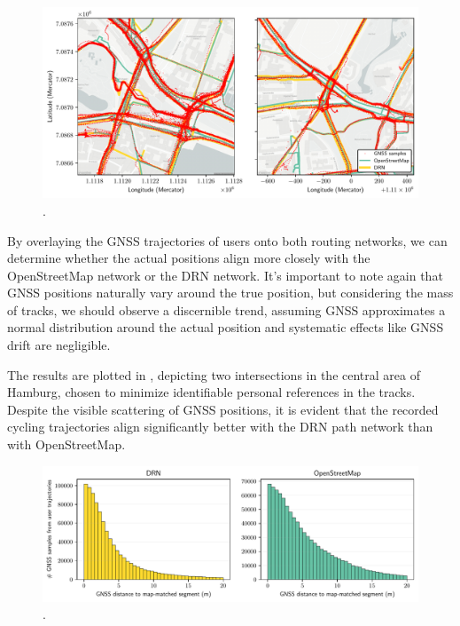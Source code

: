 \begin{figure}[t]
\centering 
\includegraphics[width=\linewidth]{images/routing-mapmatching-distance.pdf}
\caption{.}
\label{fig:routing-mapmatching-distance}
\end{figure}

By overlaying the GNSS trajectories of users onto both routing networks, we can determine whether the actual positions align more closely with the OpenStreetMap network or the DRN network. It's important to note again that GNSS positions naturally vary around the true position, but considering the mass of tracks, we should observe a discernible trend, assuming GNSS approximates a normal distribution around the actual position and systematic effects like GNSS drift are negligible.

The results are plotted in , depicting two intersections in the central area of Hamburg, chosen to minimize identifiable personal references in the tracks. Despite the visible scattering of GNSS positions, it is evident that the recorded cycling trajectories align significantly better with the DRN path network than with OpenStreetMap.

\begin{figure}[t]
\centering 
\includegraphics[width=\linewidth]{images/routing-gnss-mapmatching-distribution.pdf}
\caption{.}
\label{fig:routing-gnss-mapmatching-distribution}
\end{figure}

